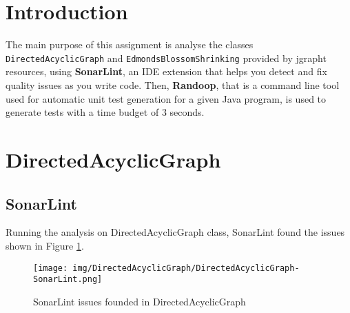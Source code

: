 \documentclass[a4paper,12pt]{article} %
\begin{document}
	\thispagestyle{empty}  
	\vspace{0.4cm}
	
	\section{Introduction}
	The main purpose of this assignment is analyse the classes \texttt{DirectedAcyclicGraph} and \texttt{EdmondsBlossomShrinking} provided by jgrapht resources, using \textbf{SonarLint}, an IDE extension that helps you detect and fix quality issues as you write code. Then, \textbf{Randoop}, that is a command line tool used for automatic unit test generation for a given Java program, is used to generate tests with a time budget of 3 seconds.
	
	\section{DirectedAcyclicGraph}
	
	\subsection*{SonarLint}
	Running the analysis on DirectedAcyclicGraph class, SonarLint found the issues shown in Figure \ref{fig:sonar-graph}.
	
	\begin{figure}[H]
		\centering
		\texttt{[image: img/DirectedAcyclicGraph/DirectedAcyclicGraph-SonarLint.png]}	
		\caption{SonarLint issues founded in DirectedAcyclicGraph}
		\label{fig:sonar-graph}
	\end{figure}
\end{document}
